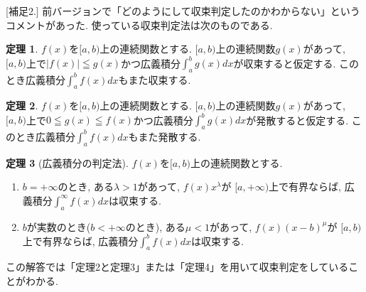 \documentclass[dvipdfmx,a4paper,11pt]{article}
\theoremstyle{definition}
\newtheorem{thm}{定理}
\begin{document}
[補足2.]  前バージョンで「どのようにして収束判定したのかわからない」というコメントがあった. 使っている収束判定法は次のものである.
  \begin{tcolorbox}[
    colback = white,
    colframe = green!35!black,
    fonttitle = \bfseries,
    breakable = true]
    \begin{thm}
$f(x)$を$[a,b)$上の連続関数とする.
$[a,b)$上の連続関数$g(x)$があって, $[a , b)$上で$|f(x)| \leqq g(x)$かつ広義積分$\int_{a}^{b} g(x) dx$が収束すると仮定する.
このとき広義積分$\int_{a}^{b} f(x) dx$もまた収束する.
 \end{thm}
 \end{tcolorbox}
 
   \begin{tcolorbox}[
    colback = white,
    colframe = green!35!black,
    fonttitle = \bfseries,
    breakable = true]
    \begin{thm}
$f(x)$を$[a,b)$上の連続関数とする.
$[a,b)$上の連続関数$g(x)$があって, $[a , b)$上で$0 \leqq g(x) \leqq f(x)$かつ広義積分$\int_{a}^{b} g(x) dx$が発散すると仮定する.
このとき広義積分$\int_{a}^{b} f(x) dx$もまた発散する.
 \end{thm}
 \end{tcolorbox}

 
 \begin{tcolorbox}[
    colback = white,
    colframe = green!35!black,
    fonttitle = \bfseries,
    breakable = true]
    \begin{thm}[広義積分の判定法]
    \label{kougi}
$f(x)$を$[a,b)$上の連続関数とする.
\begin{enumerate}
\item $b=+ \infty$のとき, ある$\lambda >1$があって, $f(x)x^{\lambda}$が
$[a, +\infty)$上で有界ならば, 広義積分$\int_{a}^{\infty} f(x)dx $は収束する.
\item $b$が実数のとき($b <+ \infty$のとき), ある$\mu <1$があって, $f(x)(x-b)^{\mu}$が
$[a, b)$上で有界ならば, 広義積分$\int_{a}^{b} f(x)dx $は収束する.
\end{enumerate}
 \end{thm}
 \end{tcolorbox}

この解答では「定理2と定理3」または「定理4」を用いて収束判定をしていることがわかる.
 
 
\end{document}
